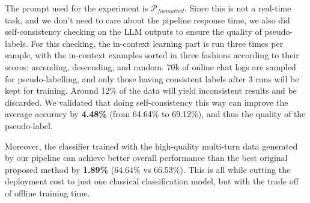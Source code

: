 The prompt used for the experiment is $\mathcal{P}_{formatted}$. Since this is not a real-time task, and we don’t need to care about the pipeline response time, we also did self-consistency checking on the LLM outputs to ensure the quality of pseudo-labels. For this checking, the in-context learning part is run three times per sample, with the in-context examples sorted in three fashions according to their scores: ascending, descending, and random. 70k of online chat logs are sampled for pseudo-labelling, and only those having consistent labels after 3 runs will be kept for training. Around 12\% of the data will yield inconsistent results and be discarded. We validated that doing self-consistency this way can improve the average accuracy by \textbf{4.48\%} (from 64.64\% to 69.12\%), and thus the quality of the pseudo-label.

Moreover, the classifier trained with the high-quality multi-turn data generated by our pipeline can achieve better overall performance than the best original proposed method by \textbf{1.89\%} (64.64\% vs 66.53\%). This is all while cutting the deployment cost to just one classical classification model, but with the trade off of offline training time.

